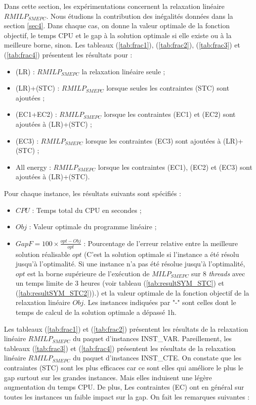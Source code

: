 {Dans cette section, les expérimentations concernent la relaxation linéaire \textit{$RMILP_{SMEPC}$}. Nous étudions la contribution des inégalités données dans la section \ref{sec4}. Dans chaque cas, on donne la valeur optimale de la fonction objectif, le temps CPU et le gap à la solution optimale si elle existe ou à la meilleure borne, sinon.  Les tableaux (\ref{tab:frac1}), (\ref{tab:frac2}), (\ref{tab:frac3}) et (\ref{tab:frac4}) présentent les résultats pour :
\begin{itemize}[label=$\square$]
	\item (LR) : \textit{$RMILP_{SMEPC}$} la relaxation linéaire seule ;
	\item (LR)+(STC) : \textit{$RMILP_{SMEPC}$} lorsque seules les contraintes (STC) sont ajoutées ;
	\item (EC1+EC2) : \textit{$RMILP_{SMEPC}$} lorsque les contraintes (EC1) et (EC2) sont ajoutées à (LR)+(STC) ; 
	\item (EC3) : \textit{$RMILP_{SMEPC}$} lorsque les contraintes (EC3) sont ajoutées à (LR)+(STC) ;
	\item All energy : \textit{$RMILP_{SMEPC}$} lorsque les contraintes (EC1), (EC2) et (EC3)  sont ajoutées à (LR)+(STC).
\end{itemize}
Pour chaque instance, les résultats suivants sont spécifiés :
\begin{itemize}[label=$\square$]
	\item $CPU$ : Temps total du CPU en secondes ;
	\item $Obj$ : Valeur optimale du programme linéaire ;
	\item $GapF =  100 \times \frac{opt-Obj}{opt}$ : Pourcentage de l'erreur relative entre la meilleure solution réalisable $opt$ (C'est la solution optimale si l'instance a été résolu jusqu'à l'optimalité. Si une instance n'a pas été résolue jusqu'à l'optimalité, $opt$ est la borne supérieure de l'exécution de \textit{$MILP_{SMEPC}$} sur 8 \textit{threads} avec un temps limite de 3 heures (voir tableau (\ref{tab:resultSYM_STC}) et (\ref{tab:resultSYM_STC2})).) et la valeur optimale de la fonction objectif de la relaxation linéaire $Obj$. Les instances indiquées par "-" sont celles dont le temps de calcul de la solution optimale a dépassé 1h.
\end{itemize}
Les tableaux (\ref{tab:frac1}) et (\ref{tab:frac2}) présentent les résultats de la relaxation linéaire \textit{$RMILP_{SMEPC}$} du  paquet d'instances INST\_VAR.
Pareillement, les tableaux (\ref{tab:frac3}) et (\ref{tab:frac4}) présentent les résultats de la relaxation linéaire \textit{$RMILP_{SMEPC}$} du  paquet d'instances INST\_CTE. On constate que les contraintes (STC) sont les plus efficaces car ce sont elles qui améliore le plus le gap surtout sur les grandes instances. Mais elles induisent une légère augmentation du temps CPU. De plus, Les contraintes (EC) ont en général sur toutes les instances un faible impact sur la gap.
On fait les remarques suivantes :
\begin{itemize}[label=$\square$]


\end{itemize}}
